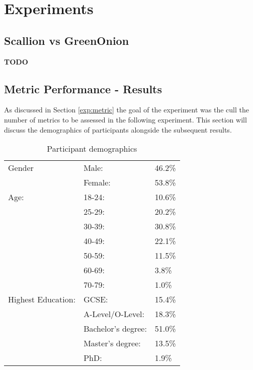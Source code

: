 \chapter{Experiments}
\label{cha:Experiments}

\section{Scallion vs GreenOnion}
\textbf{TODO}

\section{Metric Performance - Results}
As discussed in Section \ref{exp:metric} the goal of the experiment was the cull the number of metrics to be assessed in the following experiment. This section will discuss the demographics of participants alongside the subsequent results.

\begin{table}[h!]
    \centering
    \begin{tabular}{|l|ll|}
        \hline
        Gender & Male: & 46.2\% \\
               & Female: & 53.8\% \\
        \hline
        Age:   & 18-24: & 10.6\% \\ 
               & 25-29: & 20.2\% \\ 
               & 30-39: & 30.8\% \\ 
               & 40-49: & 22.1\% \\ 
               & 50-59: & 11.5\% \\ 
               & 60-69: & 3.8\% \\ 
               & 70-79: & 1.0\% \\ 
               
        \hline
        Highest Education:  
        & GCSE:                 & 15.4\%  \\
        & A-Level/O-Level:      & 18.3\% \\
        & Bachelor's degree:    & 51.0\% \\
        & Master's degree:      & 13.5\% \\ 
        & PhD:                  & 1.9\% \\
        \hline

    \end{tabular}
    \caption{Participant demographics}
    \label{tab:exp1_demo}
\end{table}


